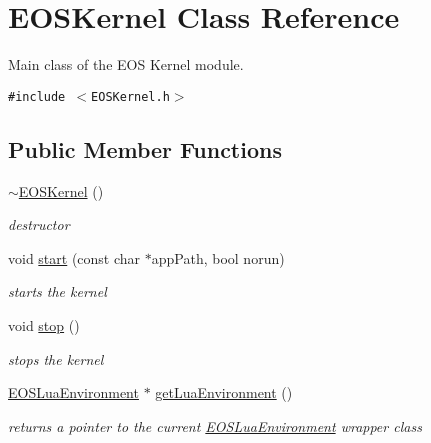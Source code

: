\hypertarget{structEOSKernel}{
\section{EOSKernel Class Reference}
\label{structEOSKernel}
}
Main class of the EOS Kernel module.  


{\tt \#include $<$EOSKernel.h$>$}

\subsection*{Public Member Functions}
\begin{CompactItemize}
\item 
\hyperlink{structEOSKernel_4d41f3d1f8081b9e9e729708ae66996b}{$\sim$EOSKernel} ()
\begin{CompactList}\small\item\em destructor \item\end{CompactList}\item 
void \hyperlink{structEOSKernel_6cbf49a8f46959908b08abaa969b0764}{start} (const char $\ast$appPath, bool norun)
\begin{CompactList}\small\item\em starts the kernel \item\end{CompactList}\item 
void \hyperlink{structEOSKernel_c0cf9a53338567326ad7e6388a54d208}{stop} ()
\begin{CompactList}\small\item\em stops the kernel \item\end{CompactList}\item 
\hyperlink{classEOSLuaEnvironment}{EOSLuaEnvironment} $\ast$ \hyperlink{structEOSKernel_dc571bb375ca531603c49e15bd5b5e1e}{getLuaEnvironment} ()
\begin{CompactList}\small\item\em returns a pointer to the current \hyperlink{classEOSLuaEnvironment}{EOSLuaEnvironment} wrapper class \item\end{CompactList}\end{CompactItemize}
